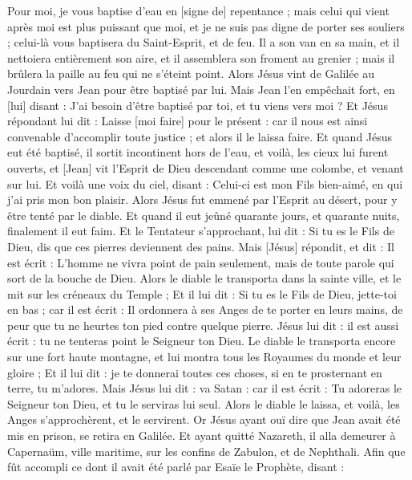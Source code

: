 \begin{multicols}{2}
Pour moi, je vous baptise d'eau en [signe de] repentance ; mais celui qui vient après moi est plus puissant que moi, et je ne suis pas digne de porter ses souliers ; celui-là vous baptisera du Saint-Esprit, et de feu.
Il a son van en sa main, et il nettoiera entièrement son aire, et il assemblera son froment au grenier ; mais il brûlera la paille au feu qui ne s'éteint point.
Alors Jésus vint de Galilée au Jourdain vers Jean pour être baptisé par lui.
Mais Jean l'en empêchait fort, en [lui] disant : J'ai besoin d'être baptisé par toi, et tu viens vers moi ?
Et Jésus répondant lui dit : Laisse [moi faire] pour le présent : car il nous est ainsi convenable d'accomplir toute justice ; et alors il le laissa faire.
Et quand Jésus eut été baptisé, il sortit incontinent hors de l'eau, et voilà, les cieux lui furent ouverts, et [Jean] vit l'Esprit de Dieu descendant comme une colombe, et venant sur lui.
Et voilà une voix du ciel, disant : Celui-ci est mon Fils bien-aimé, en qui j'ai pris mon bon plaisir.
\VerseOne{}Alors Jésus fut emmené par l'Esprit au désert, pour y être tenté par le diable.
Et quand il eut jeûné quarante jours, et quarante nuits, finalement il eut faim.
Et le Tentateur s'approchant, lui dit : Si tu es le Fils de Dieu, dis que ces pierres deviennent des pains.
Mais [Jésus] répondit, et dit : Il est écrit : L'homme ne vivra point de pain seulement, mais de toute parole qui sort de la bouche de Dieu.
Alors le diable le transporta dans la sainte ville, et le mit sur les créneaux du Temple ;
Et il lui dit : Si tu es le Fils de Dieu, jette-toi en bas ; car il est écrit : Il ordonnera à ses Anges de te porter en leurs mains, de peur que tu ne heurtes ton pied contre quelque pierre.
Jésus lui dit : il est aussi écrit : tu ne tenteras point le Seigneur ton Dieu.
Le diable le transporta encore sur une fort haute montagne, et lui montra tous les Royaumes du monde et leur gloire ;
Et il lui dit : je te donnerai toutes ces choses, si en te prosternant en terre, tu m'adores.
Mais Jésus lui dit : va Satan : car il est écrit : Tu adoreras le Seigneur ton Dieu, et tu le serviras lui seul.
Alors le diable le laissa, et voilà, les Anges s'approchèrent, et le servirent.
Or Jésus ayant ouï dire que Jean avait été mis en prison, se retira en Galilée.
Et ayant quitté Nazareth, il alla demeurer à Capernaüm, ville maritime, sur les confins de Zabulon, et de Nephthali.
Afin que fût accompli ce dont il avait été parlé par Esaïe le Prophète, disant :

\end{multicols}
